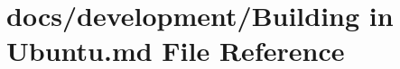 \hypertarget{Building_01in_01Ubuntu_8md}{\section{docs/development/\+Building in Ubuntu.\+md File Reference}
\label{Building_01in_01Ubuntu_8md}
}
